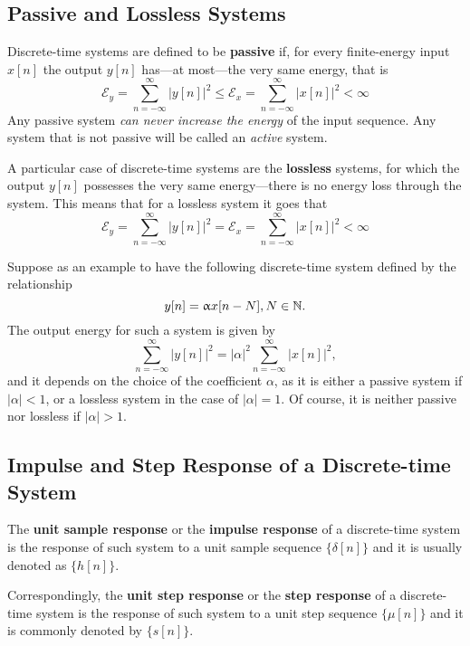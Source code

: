 \documentclass[\documentfontsize, twocolumn]{\classname}
\begin{document}
\subsection{Passive and Lossless Systems}

Discrete-time systems are defined to be \textbf{passive} if, for every finite-energy input $x[n]$ the output $y[n]$ has---at most---the very same energy, that is
\begin{equation}\label{eqn:passiveSystemsDefinition}
    \mathcal E_y = \sum_{n=-\infty}^{\infty} | y[n] |^2
    \leq \mathcal E_x = \sum_{n=-\infty}^{\infty} | x[n] |^2 < \infty
\end{equation}
Any passive system \emph{can never increase the energy} of the input sequence. Any system that is not passive will be called an \emph{active} system. 

A particular case of discrete-time systems are the \textbf{lossless} systems, for which the output $y[n]$ possesses the very same energy---there is no energy loss through the system. This means that for a lossless system it goes that
\begin{equation}\label{eqn:losslessSystemsDefinition}
    \mathcal E_y = \sum_{n=-\infty}^{\infty} | y[n] |^2
    = \mathcal E_x = \sum_{n=-\infty}^{\infty} | x[n] |^2 < \infty
\end{equation}

Suppose as an example to have the following discrete-time system defined by the relationship
\[
    y[n] = \upalpha x[n-N], N\in\mathbb N.
\]
The output energy for such a system is given by
\[
    \sum_{n=-\infty}^{\infty} |y[n]|^2 = |\alpha|^2 \sum_{n=-\infty}^{\infty}|x[n]|^2,
\]
and it depends on the choice of the coefficient $\alpha$, as it is either a passive system if $|\alpha| < 1$, or a lossless system in the case of $|\alpha| = 1$. Of course, it is neither passive nor lossless if $|\alpha| > 1$.

\subsection{Impulse and Step Response of a Discrete-time System}

The \textbf{unit sample response} or the \textbf{impulse response} of a discrete-time system is the response of such system to a unit sample sequence $\{\delta[n]\}$ and it is usually denoted as $\{h[n]\}$.

Correspondingly, the \textbf{unit step response} or the \textbf{step response} of a discrete-time system is the response of such system to a unit step sequence $\{\mu[n]\}$ and it is commonly denoted by $\{s[n]\}$.
\end{document}
